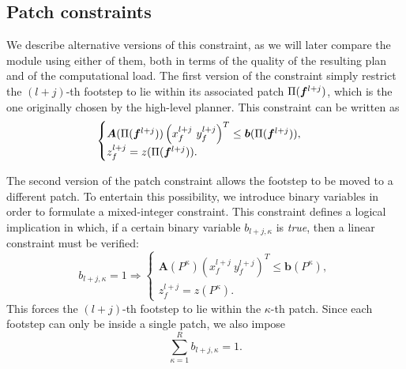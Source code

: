 \subsection{Patch constraints}
\label{sec:FAPA:patch_constraint}
We describe alternative versions of this constraint, as we will later compare
the module using either of them, both in terms of the quality of the resulting
plan and of the computational load.
The first version of the constraint simply restrict the $(l+j)$-th footstep
to lie within its associated patch $\Pi({\bm{f}}^{l+j})$, which is the one
originally chosen by the high-level planner. This constraint can be written as
\begin{equation}
    \begin{cases}
		\bm{A}(\Pi({\bm{f}}^{l+j})) \left( x_f^{l+j} \ y_f^{l+j} \right)^T \leq \bm{b}(\Pi({\bm{f}}^{l+j})), \\
		z_f^{l+j} = z(\Pi({\bm{f}}^{l+j})).
    \end{cases}
	\label{eq:FAPA:fixed_patch_constraint}
\end{equation}

The second version of the patch constraint allows the footstep to be moved
to a different patch. To entertain this possibility, we introduce binary
variables in order to formulate a mixed-integer constraint. This constraint
defines a logical implication in which, if a certain binary variable
$b_{l+j,\kappa}$ is {\em true}, then a linear constraint must be verified:
\begin{equation}
	b_{l+j,\kappa}=1 \Rightarrow 
	\begin{cases}
		\bm{A}(P^\kappa) \left( x_f^{l+j} \ y_f^{l+j} \right)^T \leq \bm{b}(P^\kappa), \\
		z_f^{l+j} = z(P^\kappa).
	\end{cases}
	\label{eq:FAPA:implication}
\end{equation}
This forces the $(l+j)$-th footstep to lie within the $\kappa$-th patch.
Since each footstep can only be inside a single patch, we also impose
\begin{equation}
    \sum^R_{\kappa=1} b_{l+j,\kappa} = 1.
    \label{eq:FAPA:sum_one}
\end{equation}

